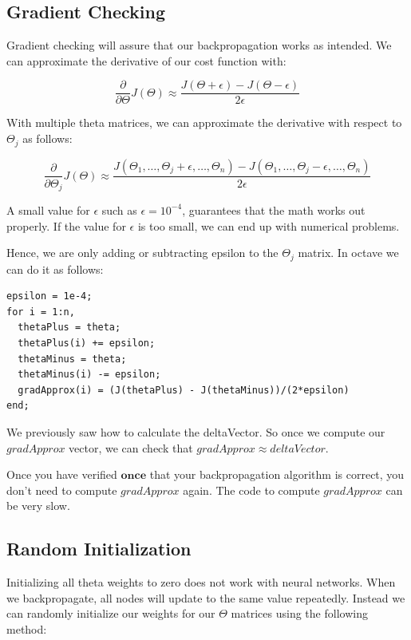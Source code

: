 \documentclass[UTF8]{article}
\begin{document}
\subsection{Gradient Checking}

Gradient checking will assure that our backpropagation works as intended. We can approximate the derivative of our cost function with:

\[\dfrac{\partial}{\partial\Theta}J(\Theta) \approx \dfrac{J(\Theta + \epsilon) - J(\Theta - \epsilon)}{2\epsilon}\]

With multiple theta matrices, we can approximate the derivative with respect to $\Theta_j$ as follows:

\[\dfrac{\partial}{\partial\Theta_j}J(\Theta) \approx \dfrac{J(\Theta_1, \dots, \Theta_j + \epsilon, \dots, \Theta_n) - J(\Theta_1, \dots, \Theta_j - \epsilon, \dots, \Theta_n)}{2\epsilon}\]

A small value for $\epsilon$ such as $\epsilon = 10^{-4}$, guarantees that the math works out properly. If the value for $\epsilon$ is too small, we can end up with numerical problems.

Hence, we are only adding or subtracting epsilon to the $\Theta_j$ matrix. In octave we can do it as follows:

\begin{lstlisting}
epsilon = 1e-4;
for i = 1:n,
  thetaPlus = theta;
  thetaPlus(i) += epsilon;
  thetaMinus = theta;
  thetaMinus(i) -= epsilon;
  gradApprox(i) = (J(thetaPlus) - J(thetaMinus))/(2*epsilon)
end;
\end{lstlisting}

We previously saw how to calculate the deltaVector. So once we compute our $gradApprox$ vector, we can check that $gradApprox \approx deltaVector$.

Once you have verified $\textbf{once}$ that your backpropagation algorithm is correct, you don't need to compute $gradApprox$ again. The code to compute $gradApprox$ can be very slow.

\subsection{Random Initialization}

Initializing all theta weights to zero does not work with neural networks. When we backpropagate, all nodes will update to the same value repeatedly. Instead we can randomly initialize our weights for our $\Theta$ matrices using the following method:
\end{document}
